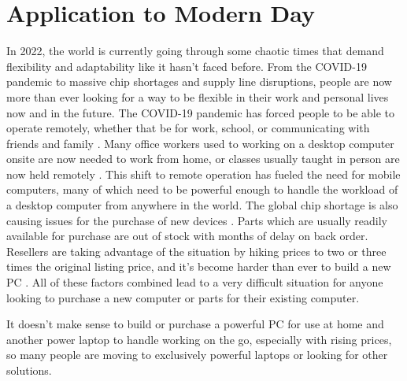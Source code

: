 \section{Application to Modern Day}\label{sec:ApplicationToModernDay}

In 2022, the world is currently going through some chaotic times that demand flexibility and adaptability like it hasn't faced before.
From the COVID-19 pandemic to massive chip shortages and supply line disruptions, people are now more than ever looking for a way to be flexible in their work and personal lives now and in the future.
The COVID-19 pandemic has forced people to be able to operate remotely, whether that be for work, school, or communicating with friends and family \cite{levanon_2020}.
Many office workers used to working on a desktop computer onsite are now needed to work from home, or classes usually taught in person are now held remotely \cite{ASU_covid_19}.
This shift to remote operation has fueled the need for mobile computers, many of which need to be powerful enough to handle the workload of a desktop computer from anywhere in the world.
The global chip shortage is also causing issues for the purchase of new devices \cite{chipshortage_jpmorgan}.
Parts which are usually readily available for purchase are out of stock with months of delay on back order.
Resellers are taking advantage of the situation by hiking prices to two or three times the original listing price, and it's become harder than ever to build a new PC \cite{tamarov_2021}.
All of these factors combined lead to a very difficult situation for anyone looking to purchase a new computer or parts for their existing computer.

It doesn't make sense to build or purchase a powerful PC for use at home and another power laptop to handle working on the go, especially with rising prices, so many people are moving to exclusively powerful laptops or looking for other solutions.
